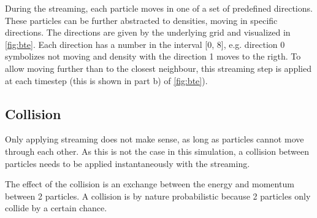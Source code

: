 During the streaming, each particle moves in one of a set of predefined directions.
These particles can be further abstracted to densities, moving in specific directions.
The directions are given by the underlying grid and visualized in \ref{fig:bte}.
Each direction has a number in the interval [0, 8], e.g. direction 0 symbolizes not moving and density with the direction 1 moves to the rigth.
To allow moving further than to the closest neighbour, this streaming step is applied at each timestep (this is shown in part b) of \ref{fig:bte}).

\subsection{Collision}
Only applying streaming does not make sense, as long as particles cannot move through each other.
As this is not the case in this simulation, a collision between particles needs to be applied instantaneously with the streaming.

The effect of the collision is an exchange between the energy and momentum between 2 particles.
A collision is by nature probabilistic because 2 particles only collide by a certain chance.